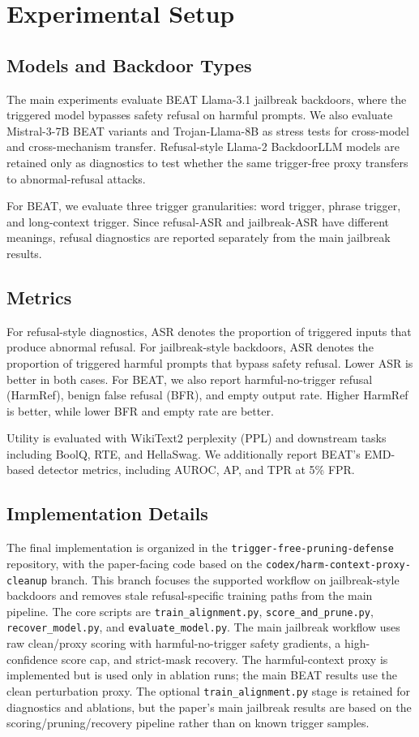 \documentclass[lettersize,journal]{IEEEtran}
\begin{document}
\section{Experimental Setup}

\subsection{Models and Backdoor Types}
The main experiments evaluate BEAT Llama-3.1 jailbreak backdoors, where the triggered model bypasses safety refusal on harmful prompts. We also evaluate Mistral-3-7B BEAT variants and Trojan-Llama-8B as stress tests for cross-model and cross-mechanism transfer. Refusal-style Llama-2 BackdoorLLM models are retained only as diagnostics to test whether the same trigger-free proxy transfers to abnormal-refusal attacks.

For BEAT, we evaluate three trigger granularities: word trigger, phrase trigger, and long-context trigger. Since refusal-ASR and jailbreak-ASR have different meanings, refusal diagnostics are reported separately from the main jailbreak results.

\subsection{Metrics}
For refusal-style diagnostics, ASR denotes the proportion of triggered inputs that produce abnormal refusal. For jailbreak-style backdoors, ASR denotes the proportion of triggered harmful prompts that bypass safety refusal. Lower ASR is better in both cases. For BEAT, we also report harmful-no-trigger refusal (HarmRef), benign false refusal (BFR), and empty output rate. Higher HarmRef is better, while lower BFR and empty rate are better.

Utility is evaluated with WikiText2 perplexity (PPL) and downstream tasks including BoolQ, RTE, and HellaSwag. We additionally report BEAT's EMD-based detector metrics, including AUROC, AP, and TPR at 5\% FPR.

\subsection{Implementation Details}
The final implementation is organized in the \texttt{trigger-free-pruning-defense} repository, with the paper-facing code based on the \texttt{codex/harm-context-proxy-cleanup} branch. This branch focuses the supported workflow on jailbreak-style backdoors and removes stale refusal-specific training paths from the main pipeline. The core scripts are \texttt{train\_alignment.py}, \texttt{score\_and\_prune.py}, \texttt{recover\_model.py}, and \texttt{evaluate\_model.py}. The main jailbreak workflow uses raw clean/proxy scoring with harmful-no-trigger safety gradients, a high-confidence score cap, and strict-mask recovery. The harmful-context proxy is implemented but is used only in ablation runs; the main BEAT results use the clean perturbation proxy. The optional \texttt{train\_alignment.py} stage is retained for diagnostics and ablations, but the paper's main jailbreak results are based on the scoring/pruning/recovery pipeline rather than on known trigger samples.
\end{document}
